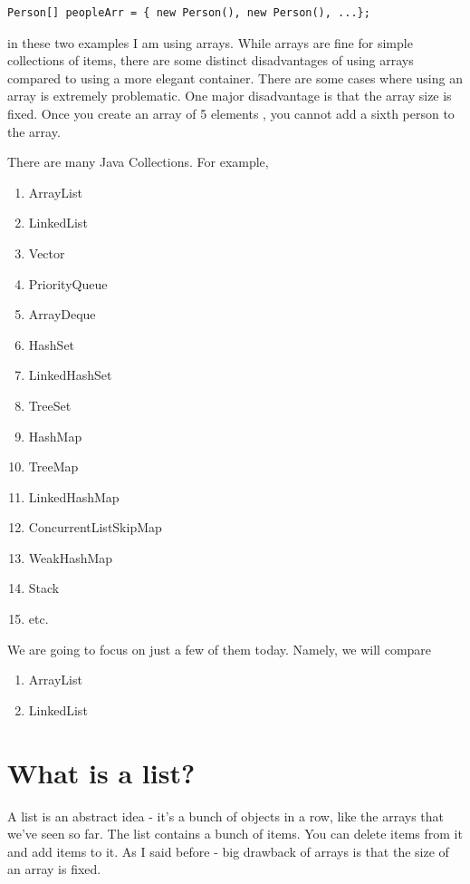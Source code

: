 \documentclass[12pt]{article}
\begin{document}
\begin{lstlisting}
Person[] peopleArr = { new Person(), new Person(), ...};
\end{lstlisting}

in these two examples I am using arrays. While arrays are fine for simple collections of items, there are some distinct disadvantages of using arrays compared to using a more elegant container. There are some cases where using an array is extremely problematic. One major disadvantage is that the array size is fixed. Once you create an array of 5  elements , you cannot add a sixth person to the array.  

There are many Java Collections. For example, 

\begin{enumerate}
\item ArrayList
\item LinkedList
\item Vector
\item PriorityQueue
\item ArrayDeque
\item HashSet
\item LinkedHashSet
\item TreeSet
\item HashMap
\item TreeMap
\item LinkedHashMap
\item ConcurrentListSkipMap
\item WeakHashMap
\item Stack
\item etc.
\end{enumerate}

We are going to focus on just a few of them today. Namely, we will compare

\begin{enumerate}
\item ArrayList
\item LinkedList
\end{enumerate}

\section{What is a list?}
A list is an abstract idea - it's a bunch of objects in a row, like the arrays that we've seen so far. The list contains a bunch of items. You can delete items from it and add items to it. As I said before - big drawback of arrays is that the size of an array is fixed.
\end{document}
